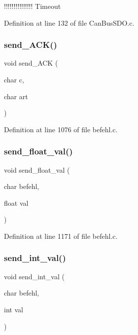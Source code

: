 !!!!!!!!!!!!!!! Timeout 

Definition at line 132 of file Can\+Bus\+S\+D\+O.\+c.

\mbox{\label{befehl_8c_a60e3238b3d5b4cb327b5f6b9fd5690d1}} 
\subsubsection{send\+\_\+\+A\+C\+K()}
{\footnotesize\ttfamily void send\+\_\+\+A\+CK (\begin{DoxyParamCaption}\item[{char}]{c,  }\item[{char}]{art }\end{DoxyParamCaption})}



Definition at line 1076 of file befehl.\+c.

\mbox{\label{befehl_8c_a088603b084cb8318b4d339c6eef33452}} 
\subsubsection{send\+\_\+float\+\_\+val()}
{\footnotesize\ttfamily void send\+\_\+float\+\_\+val (\begin{DoxyParamCaption}\item[{char}]{befehl,  }\item[{float}]{val }\end{DoxyParamCaption})}



Definition at line 1171 of file befehl.\+c.

\mbox{\label{befehl_8c_a599c5b28f6622db9832f5a0cd4826d60}} 
\subsubsection{send\+\_\+int\+\_\+val()}
{\footnotesize\ttfamily void send\+\_\+int\+\_\+val (\begin{DoxyParamCaption}\item[{char}]{befehl,  }\item[{int}]{val }\end{DoxyParamCaption})}



